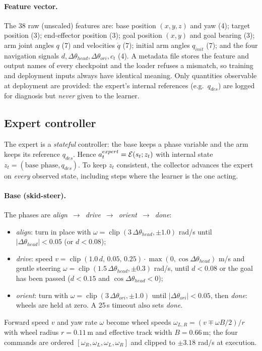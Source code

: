 \paragraph{Feature vector.} The 38 raw (unscaled) features are: base position $(x,y,z)$ and yaw (4); target position (3); end-effector position (3); goal position $(x,y)$ and goal bearing (3); arm joint angles $q$ (7) and velocities $\dot q$ (7); initial arm angles $q_{init}$ (7); and the four navigation signals $d,\Delta\theta_{head},\Delta\theta_{ori},c_t$ (4). A metadata file stores the feature and output names of every checkpoint and the loader refuses a mismatch, so training and deployment inputs always have identical meaning. Only quantities observable at deployment are provided: the expert's internal references (e.g.\ $q_{des}$) are logged for diagnosis but \emph{never} given to the learner.

\subsection{Expert controller}
\label{dag:expert}

The expert is a \emph{stateful} controller: the base keeps a phase variable and the arm keeps its reference $q_{des}$. Hence $a_t^{expert}=\mathcal{E}(s_t;z_t)$ with internal state $z_t=(\text{base phase},q_{des})$. To keep $z_t$ consistent, the collector advances the expert on \emph{every} observed state, including steps where the learner is the one acting.

\paragraph{Base (skid-steer).} The phases are \emph{align}~$\to$~\emph{drive}~$\to$~\emph{orient}~$\to$~\emph{done}:
\begin{itemize}
  \item \emph{align}: turn in place with $\omega=\operatorname{clip}(3\,\Delta\theta_{head},\pm1.0)$ rad/s until $|\Delta\theta_{head}|<0.05$ (or $d<0.08$);
  \item \emph{drive}: speed $v=\operatorname{clip}(1.0\,d,\,0.05,\,0.25)\cdot\max(0,\cos\Delta\theta_{head})$ m/s and gentle steering $\omega=\operatorname{clip}(1.5\,\Delta\theta_{head},\pm0.3)$ rad/s, until $d<0.08$ or the goal has been passed ($d<0.15$ and $\cos\Delta\theta_{head}<0$);
  \item \emph{orient}: turn with $\omega=\operatorname{clip}(3\,\Delta\theta_{ori},\pm1.0)$ until $|\Delta\theta_{ori}|<0.05$, then \emph{done}: wheels are held at zero. A 25\,s timeout also sets \emph{done}.
\end{itemize}
Forward speed $v$ and yaw rate $\omega$ become wheel speeds $\omega_{L,R}=(v\mp\omega B/2)/r$ with wheel radius $r=0.11$\,m and effective track width $B=0.66$\,m; the four commands are ordered $[\omega_R,\omega_L,\omega_L,\omega_R]$ and clipped to $\pm3.18$ rad/s at execution.

